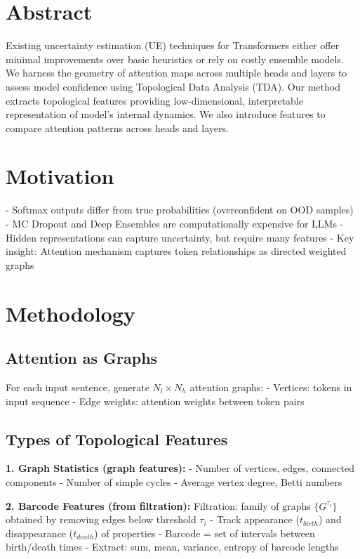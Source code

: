 
\section{Abstract}
Existing uncertainty estimation (UE) techniques for Transformers either offer minimal improvements over basic heuristics or rely on costly ensemble models. We harness the geometry of attention maps across multiple heads and layers to assess model confidence using Topological Data Analysis (TDA). Our method extracts topological features providing low-dimensional, interpretable representation of model's internal dynamics. We also introduce features to compare attention patterns across heads and layers.

\section{Motivation}
- Softmax outputs differ from true probabilities (overconfident on OOD samples)
- MC Dropout and Deep Ensembles are computationally expensive for LLMs
- Hidden representations can capture uncertainty, but require many features
- Key insight: Attention mechanism captures token relationships as directed weighted graphs

\section{Methodology}

\subsection{Attention as Graphs}
For each input sentence, generate $N_l \times N_h$ attention graphs:
- Vertices: tokens in input sequence
- Edge weights: attention weights between token pairs

\subsection{Types of Topological Features}

\textbf{1. Graph Statistics (graph features):}
- Number of vertices, edges, connected components
- Number of simple cycles
- Average vertex degree, Betti numbers

\textbf{2. Barcode Features (from filtration):}
Filtration: family of graphs $\{G^{\tau_i}\}$ obtained by removing edges below threshold $\tau_i$
- Track appearance ($t_{birth}$) and disappearance ($t_{death}$) of properties
- Barcode = set of intervals between birth/death times
- Extract: sum, mean, variance, entropy of barcode lengths


